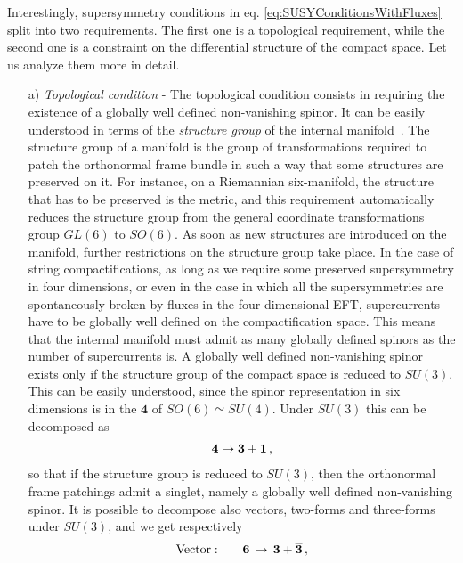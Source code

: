 \documentclass[12pt,a4paper]{book}
\begin{document}
Interestingly, supersymmetry conditions in eq. \eqref{eq:SUSYConditionsWithFluxes} split into two requirements. The first one is a topological requirement, while the second one is a constraint on the differential structure of the compact space. Let us analyze them more in detail.
\begin{itemize}
\item[a)] \textit{Topological condition} - The topological condition consists in requiring the existence of a globally well defined non-vanishing spinor. It can be easily understood in terms of the \textit{structure group} of the internal manifold~\cite{Gauntlett:2002fz, Bovy:2005qq, Behrndt:2003uq, Kaste:2003zd, Martelli:2003ki, MacConamhna:2004fb, Gillard:2004xq, Dall'Agata:2004dk}. The structure group of a manifold is the group of transformations required to patch the orthonormal frame bundle in such a way that some structures are preserved on it. For instance, on a Riemannian six-manifold, the structure that has to be preserved is the metric, and this requirement automatically reduces the structure group from the general coordinate transformations group $GL(6)$ to $SO(6)$. As soon as new structures are introduced on the manifold, further restrictions on the structure group take place. In the case of string compactifications, as long as we require some preserved supersymmetry in four dimensions, or even in the case in which all the supersymmetries are spontaneously broken by fluxes in the four-dimensional EFT, supercurrents have to be globally well defined on the compactification space. This means that the internal manifold must admit as many globally defined spinors as the number of supercurrents is. A globally well defined non-vanishing spinor exists only if the structure group of the compact space is reduced to $SU(3)$. This can be easily understood, since the spinor representation in six dimensions is in the $\mathbf{4}$ of $SO(6) \simeq SU(4)$. Under $SU(3)$ this can be decomposed as
\begin{align}
\label{eq:SpinorDecompositionSU3}
\bf{4} \rightarrow \bf{3} + \bf{1} \,,
\end{align}
so that if the structure group is reduced to $SU(3)$, then the orthonormal frame patchings admit a singlet, namely a globally well defined non-vanishing spinor. It is possible to decompose also vectors, two-forms and three-forms under $SU(3)$, and we get respectively
\begin{align}
\text{Vector}: &\quad &&\bf{6} \, \rightarrow \, \bf{3} + \bf{\overline{3}} \,, \nonumber \\

\end{align}
\end{itemize}
\end{document}
